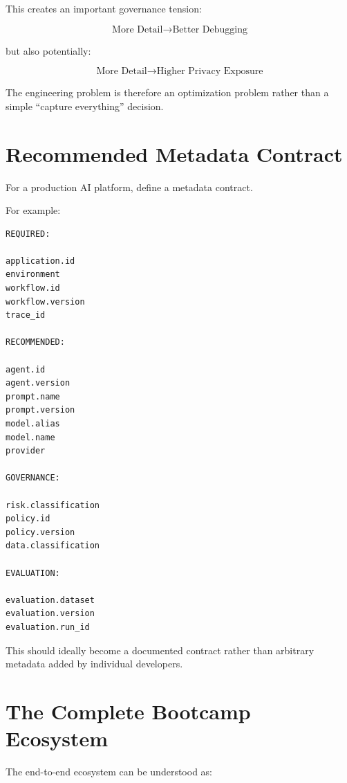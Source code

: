 \documentclass[11pt,a4paper]{article}
\begin{document}
This creates an important governance tension:

\[
\text{More Detail} \rightarrow \text{Better Debugging}
\]

but also potentially:

\[
\text{More Detail} \rightarrow \text{Higher Privacy Exposure}
\]

The engineering problem is therefore an optimization problem rather than a simple ``capture everything'' decision.

\section{Recommended Metadata Contract}

For a production AI platform, define a metadata contract.

For example:

\begin{lstlisting}
REQUIRED:

application.id
environment
workflow.id
workflow.version
trace_id

RECOMMENDED:

agent.id
agent.version
prompt.name
prompt.version
model.alias
model.name
provider

GOVERNANCE:

risk.classification
policy.id
policy.version
data.classification

EVALUATION:

evaluation.dataset
evaluation.version
evaluation.run_id
\end{lstlisting}

This should ideally become a documented contract rather than arbitrary metadata added by individual developers.

\section{The Complete Bootcamp Ecosystem}

The end-to-end ecosystem can be understood as:
\end{document}
